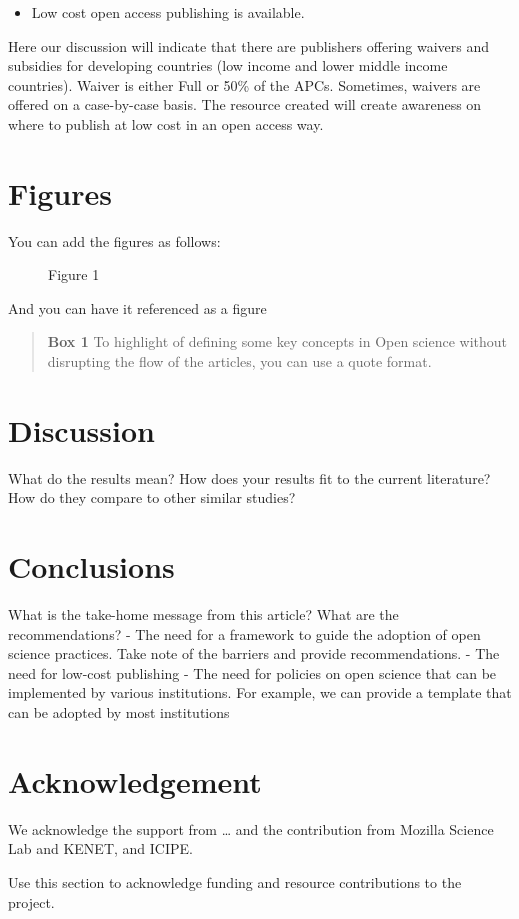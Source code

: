 \begin{itemize}
\tightlist
\item
  Low cost open access publishing is available.
\end{itemize}

Here our discussion will indicate that there are publishers offering
waivers and subsidies for developing countries (low income and lower
middle income countries). Waiver is either Full or 50\% of the APCs.
Sometimes, waivers are offered on a case-by-case basis. The resource
created will create awareness on where to publish at low cost in an open
access way.

\section*{Figures}\label{figures}

You can add the figures as follows:

\begin{figure}[htbp]
\centering
\caption{Figure 1}
\end{figure}

And you can have it referenced as a figure

\begin{quote}
\textbf{Box 1} To highlight of defining some key concepts in Open
science without disrupting the flow of the articles, you can use a quote
format.
\end{quote}

\section*{Discussion}\label{discussion}

What do the results mean? How does your results fit to the current
literature? How do they compare to other similar studies?

\section*{Conclusions}\label{conclusions}

What is the take-home message from this article? What are the
recommendations? - The need for a framework to guide the adoption of
open science practices. Take note of the barriers and provide
recommendations. - The need for low-cost publishing - The need for
policies on open science that can be implemented by various
institutions. For example, we can provide a template that can be adopted
by most institutions

\section{Acknowledgement}\label{acknowledgement}

We acknowledge the support from \ldots{} and the contribution from
Mozilla Science Lab and KENET, and ICIPE.

Use this section to acknowledge funding and resource contributions to
the project.
